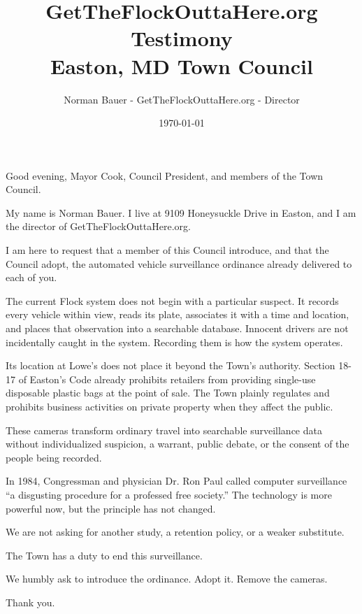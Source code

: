 \documentclass[11pt]{article}
\author{Norman Bauer - GetTheFlockOuttaHere.org - Director}
\date{\today}
\title{GetTheFlockOuttaHere.org Testimony\\\medskip
\large Easton, MD Town Council}
\begin{document}
\maketitle
\RaggedRight

Good evening, Mayor Cook, Council President, and members of the Town Council.

My name is Norman Bauer. I live at 9109 Honeysuckle Drive in Easton, and I am the director of GetTheFlockOuttaHere.org.

I am here to request that a member of this Council introduce, and that the Council adopt, the automated vehicle surveillance ordinance already delivered to each of you.

The current Flock system does not begin with a particular suspect. It records every vehicle within view, reads its plate, associates it with a time and location, and places that observation into a searchable database. Innocent drivers are not incidentally caught in the system. Recording them is how the system operates.

Its location at Lowe’s does not place it beyond the Town’s authority. Section 18-17 of Easton’s Code already prohibits retailers from providing single-use disposable plastic bags at the point of sale. The Town plainly regulates and prohibits business activities on private property when they affect the public.

These cameras transform ordinary travel into searchable surveillance data without individualized suspicion, a warrant, public debate, or the consent of the people being recorded.

In 1984, Congressman and physician Dr. Ron Paul called computer surveillance “a disgusting procedure for a professed free society.” The technology is more powerful now, but the principle has not changed.

We are not asking for another study, a retention policy, or a weaker substitute.

The Town has a duty to end this surveillance.

We humbly ask to introduce the ordinance. Adopt it. Remove the cameras.

Thank you.
\end{document}
